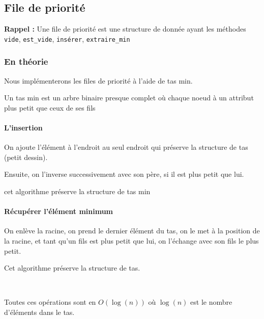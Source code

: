 \subsection{File de priorité}

\textbf{Rappel :} Une file de priorité est une structure de donnée ayant les méthodes \texttt{vide}, \texttt{est\_vide}, \texttt{insérer}, \texttt{extraire\_min}

\subsubsection{En théorie}

\begin{idee} 
	Nous implémenterons les files de priorité à l'aide de tas min.
\end{idee}

\begin{definition}
	Un tas min est un arbre binaire presque complet où chaque noeud à un attribut plus petit que ceux de ses fils
\end{definition}

\paragraph{L'insertion}
	On ajoute l'élément à l'endroit au seul endroit qui préserve la structure de tas (petit dessin).
	
	Ensuite, on l'inverse successivement avec son père, si il est plus petit que lui.

	\begin{theorem}
		cet algorithme préserve la structure de tas min
	\end{theorem}

\paragraph{Récupérer l'élément minimum}

	On enlève la racine, on prend le dernier élément du tas, on le met à la position de la racine, et tant qu'un fils est plus petit que lui, on l'échange avec son fils le plus petit.

	\begin{theorem}
		Cet algorithme préserve la structure de tas.
	\end{theorem}
\enspace \\
\begin{theorem}
	Toutes ces opérations sont en $O(\log(n))$ où $\log(n)$ est le nombre d'éléments dans le tas.
\end{theorem}


